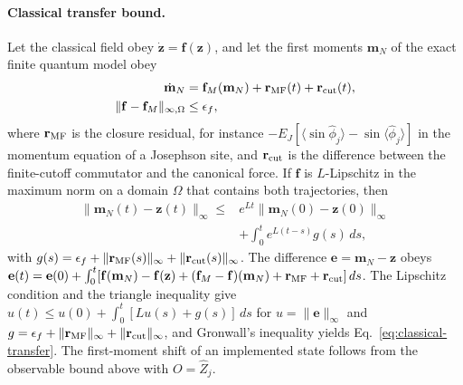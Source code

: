 \documentclass[pra,twocolumn,superscriptaddress,nofootinbib,floatfix]{revtex4-2}
\theoremstyle{remark}
\newcommand{\revcolor}{\color{blue}}
\DeclareRobustCommand{\rev}[1]{{\revcolor #1}}
\begin{document}
\paragraph{\rev{Classical transfer bound.}}
\rev{Let the classical field obey \(\dot{\mathbf z}=\mathbf f(\mathbf z)\), and let the first moments \(\mathbf m_N\) of the exact finite quantum model obey}
\begingroup\revcolor
\begin{align}
\dot{\mathbf m}_N&=\mathbf f_M(\mathbf m_N)+\mathbf r_{\rm MF}(t)+\mathbf r_{\rm cut}(t),\nonumber\\
\|\mathbf f-\mathbf f_M\|_{\infty,\Omega}&\le\epsilon_f,
\end{align}
\endgroup
\rev{where \(\mathbf r_{\rm MF}\) is the closure residual, for instance \(-E_J[\langle\sin\hat\phi_j\rangle-\sin\langle\hat\phi_j\rangle]\) in the momentum equation of a Josephson site, and \(\mathbf r_{\rm cut}\) is the difference between the finite-cutoff commutator and the canonical force.} \rev{If \(\mathbf f\) is \(L\)-Lipschitz in the maximum norm on a domain \(\Omega\) that contains both trajectories, then}
\begingroup\revcolor
\begin{align}
\|\mathbf m_N(t)-\mathbf z(t)\|_\infty
\le{}& e^{Lt}\|\mathbf m_N(0)-\mathbf z(0)\|_\infty\nonumber\\
&+\int_0^t e^{L(t-s)}g(s)\,ds,
\label{eq:classical-transfer}
\end{align}
\endgroup
\rev{with \(g(s)=\epsilon_f+\|\mathbf r_{\rm MF}(s)\|_\infty+\|\mathbf r_{\rm cut}(s)\|_\infty\).} \rev{The difference \(\mathbf e=\mathbf m_N-\mathbf z\) obeys \(\mathbf e(t)=\mathbf e(0)+\int_0^t[\mathbf f(\mathbf m_N)-\mathbf f(\mathbf z)+(\mathbf f_M-\mathbf f)(\mathbf m_N)+\mathbf r_{\rm MF}+\mathbf r_{\rm cut}]\,ds\).} \rev{The Lipschitz condition and the triangle inequality give \(u(t)\le u(0)+\int_0^t[Lu(s)+g(s)]\,ds\) for \(u=\|\mathbf e\|_\infty\) and \(g=\epsilon_f+\|\mathbf r_{\rm MF}\|_\infty+\|\mathbf r_{\rm cut}\|_\infty\), and Gronwall's inequality yields Eq.~\eqref{eq:classical-transfer}.} \rev{The first-moment shift of an implemented state follows from the observable bound above with \(O=\hat Z_j\).}
\end{document}
